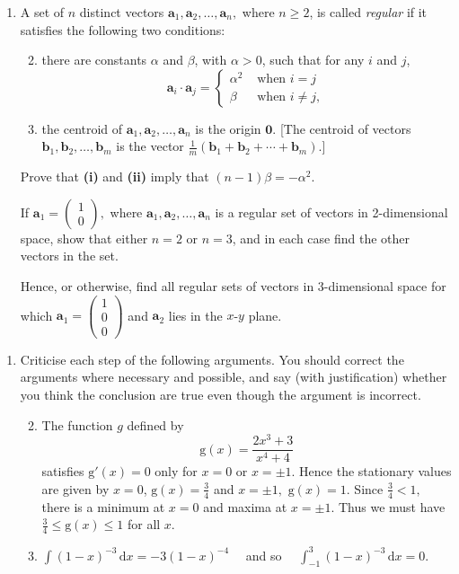 \documentclass[a4, 11pt]{report}
\newlength{\qspace}
\newcounter{qnumber}
\newenvironment{question}%
 {\vspace{\qspace}
  \begin{enumerate}[\bfseries 1\quad][10]%
    \setcounter{enumi}{\value{qnumber}}%
    \item%
 }
{
  \end{enumerate}
  \filbreak
  \stepcounter{qnumber}
 }
\newenvironment{questionparts}[1][1]%
 {
  \begin{enumerate}[\bfseries (i)]%
    \setcounter{enumii}{#1}
    \addtocounter{enumii}{-1}
    \setlength{\itemsep}{5mm}
    \setlength{\parskip}{8pt}
 }
 {
  \end{enumerate}
 }
\begin{document}
\begin{question}
A set of $n$ distinct vectors $\mathbf{a}_{1},\mathbf{a}_{2},\ldots,\mathbf{a}_{n},$
where $n\geqslant2$, is called \textit{regular }if it satisfies the
following two conditions: 

\begin{questionparts}
\item there are constants $\alpha$ and $\beta$, with $\alpha>0$, such
that for any $i$ and $j$, 
\[
\mathbf{a}_{i}\cdot\mathbf{a}_{j}=\begin{cases}
\alpha^{2} & \mbox{ when }i=j\\
\beta & \mbox{ when }i\neq j,
\end{cases}
\]

\item the centroid of $\mathbf{a}_{1},\mathbf{a}_{2},\ldots,\mathbf{a}_{n}$
is the origin $\mathbf{0}.$ {[}The centroid of vectors $\mathbf{b}_{1},\mathbf{b}_{2},\ldots,\mathbf{b}_{m}$
is the vector $\frac{1}{m}(\mathbf{b}_{1}+\mathbf{b}_{2}+\cdots+\mathbf{b}_{m}).${]} 
\end{questionparts}

Prove that \textbf{(i) }and \textbf{(ii) }imply that $(n-1)\beta=-\alpha^{2}.$


If $\mathbf{a}_{1}=\begin{pmatrix}1\\
0
\end{pmatrix},$ where $\mathbf{a}_{1},\mathbf{a}_{2},\ldots,\mathbf{a}_{n}$ is a
regular set of vectors in 2-dimensional space, show that either $n=2$
or $n=3$, and in each case find the other vectors in the set. 


Hence, or otherwise, find all regular sets of vectors in 3-dimensional
space for which $\mathbf{a}_{1}=\begin{pmatrix}1\\
0\\
0
\end{pmatrix}$ \phantom{ } and $\mathbf{a}_{2}$ lies in the $x$-$y$ plane. 
\end{question}
	
	\begin{question}
Criticise each step of the following arguments. You should correct
the arguments where necessary and possible, and say (with justification)
whether you think the conclusion are true even though the argument
is incorrect. 

\begin{questionparts}
\item The function $g$ defined by 
\[
\mathrm{g}(x)=\frac{2x^{3}+3}{x^{4}+4}
\]
satisfies $\mathrm{g}'(x)=0$ only for $x=0$ or $x=\pm1.$ Hence
the stationary values are given by $x=0$, $\mathrm{g}(x)=\frac{3}{4}$
and $x=\pm1,$ $\mathrm{g}(x)=1.$ Since $\frac{3}{4}<1,$ there is
a minimum at $x=0$ and maxima at $x=\pm1.$ Thus we must have $\frac{3}{4}\leqslant\mathrm{g}(x)\leqslant1$
for all $x$. 
\item ${\displaystyle \int(1-x)^{-3}\,\mathrm{d}x=-3(1-x)^{-4}}\quad$ and so
$\quad{\displaystyle \int_{-1}^{3}(1-x)^{-3}\,\mathrm{d}x=0.}$
\end{questionparts}
	 \end{question}
	 
\end{document}
